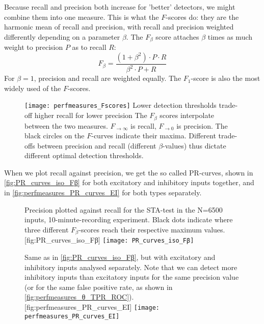 Because recall and precision both increase for 'better' detectors, we might combine them into one measure. This is what the $F$-scores do: they are the harmonic mean of recall and precision, with recall and precision weighted differently depending on a parameter $β$. The $F_β$ score attaches $β$ times as much weight to precision $P$ as to recall $R$:
\begin{equation}
    F_β = \frac{(1+β^2) · P · R}{β^2 · P + R}
\end{equation}
For $β = 1$, precision and recall are weighted equally. The $F_1$-score is also the most widely used of the $F$-scores.


\begin{figure}
    \texttt{[image: perfmeasures\_Fscores]}
    \captionn
        {Lower detection thresholds trade-off higher recall for lower precision}
        {The $F_β$ scores interpolate between the two measures. $F_{→∞}$ is recall, $F_{→0}$ is precision. The black circles on the $F$-curves indicate their maxima. Different trade-offs between precision and recall (different $β$-values) thus dictate different optimal detection thresholds.}
    \label{fig:perfmeasures_Fscores}
\end{figure}

When we plot recall against precision, we get the so called PR-curves, shown in \cref{fig:PR_curves_iso_Fβ} for both excitatory and inhibitory inputs together, and in \cref{fig:perfmeasures_PR_curves_EI} for both types separately.


\begin{figure}
    \begin{sidecaption}
        {Precision plotted against recall for the STA-test in the N=6500 inputs, 10-minute-recording experiment. Black dots indicate where three different $F_β$-scores reach their respective maximum values.}
        [fig:PR_curves_iso_Fβ]
        \texttt{[image: PR\_curves\_iso\_Fβ]}
    \end{sidecaption}
\end{figure}

\begin{figure}
    \begin{sidecaption}
        {Same as in \cref{fig:PR_curves_iso_Fβ}, but with excitatory and inhibitory inputs analysed separately. Note that we can detect more inhibitory inputs than excitatory inputs for the same precision value (or for the same false positive rate, as shown in \cref{fig:perfmeasures_θ_TPR_ROC}).}
        [fig:perfmeasures_PR_curves_EI]
        \texttt{[image: perfmeasures\_PR\_curves\_EI]}
    \end{sidecaption}
\end{figure}


